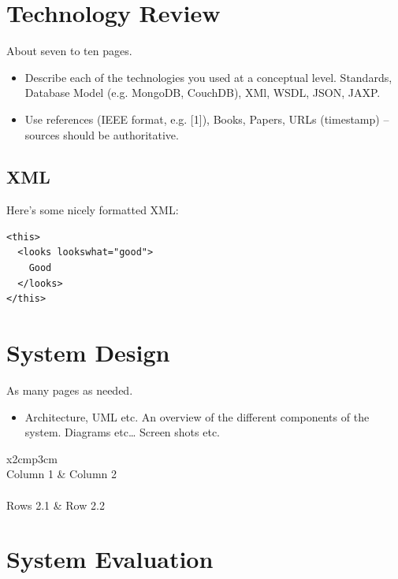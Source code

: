 \chapter{Technology Review}
About seven to ten pages.
\begin{itemize}
\item Describe each of the technologies you used at a conceptual level. Standards, Database Model (e.g. MongoDB, CouchDB), XMl, WSDL, JSON, JAXP.
\item Use references (IEEE format, e.g. [1]), Books, Papers, URLs (timestamp) – sources should be authoritative. 
\end{itemize}

\section{XML}
Here's some nicely formatted XML:
\begin{verbatim}
<this>
  <looks lookswhat="good">
    Good
  </looks>
</this>
\end{verbatim}

\chapter{System Design}
As many pages as needed.
\begin{itemize}
\item Architecture, UML etc. An overview of the different components of the system. Diagrams etc… Screen shots etc.
\end{itemize}

\begin{table}[h]
  \centering
  \begin{tabular}{x{2cm}p{3cm}}
    \toprule \\
    Column 1 & Column 2 \\
    \midrule \\
    Rows 2.1 & Row 2.2 \\
    \bottomrule
  \end{tabular}
  \caption{A table.}
  \label{table:mytable}
\end{table}

\chapter{System Evaluation}
